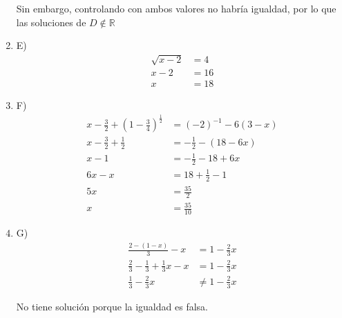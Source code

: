 \documentclass{article}
\begin{document}
\begin{enumerate}
	Sin embargo, controlando con ambos valores no habría igualdad, por lo que las soluciones de $D \not\in \mathbb{R}$

	\item[] E)
	\begin{align*}
		\sqrt{x-2} &= 4\\
		x-2 &= 16\\
		x &= 18
	\end{align*}

	\item[] F)
	\begin{align*}
		x - \frac{3}{2} + \left( 1 - \frac{3}{4} \right)^{\frac{1}{2}} &= (-2)^{-1} - 6(3-x)\\
		x - \frac{3}{2} + \frac{1}{2} &= - \frac{1}{2} - (18 - 6x)\\
		x-1 &= - \frac{1}{2} - 18 + 6x\\
		6x-x &= 18 + \frac{1}{2} - 1\\
		5x &= \frac{35}{2}\\
		x &= \frac{35}{10}
	\end{align*}

	\item[] G)
	\begin{align*}
		\frac{2-(1-x)}{3} - x &= 1 - \frac{2}{3} x\\
		\frac{2}{3} - \frac{1}{3} + \frac{1}{3}x - x &= 1 - \frac{2}{3}x\\
		\frac{1}{3} - \frac{2}{3}x &\neq 1 - \frac{2}{3}x
	\end{align*}

	No tiene solución porque la igualdad es falsa.

\end{enumerate}
\end{document}
